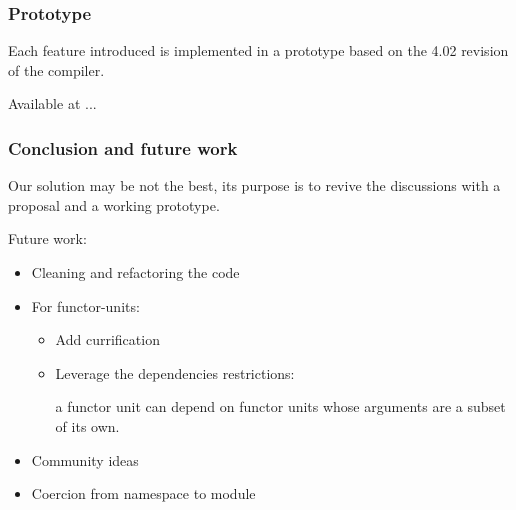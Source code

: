 \documentclass{beamer}
\begin{document}
\begin{frame}
\frametitle{Prototype}

Each feature introduced is implemented in a prototype based on the 4.02
revision of the compiler.

Available at ... 
\end{frame}

\begin{frame}
\frametitle{Conclusion and future work}

Our solution may be not the best, its purpose is to revive the discussions with
a proposal and a working prototype. 

\medskip

Future work:
\begin{itemize}
  \item Cleaning and refactoring the code
  \item For functor-units:
    \begin{itemize}
      \item Add currification
      \item Leverage the dependencies restrictions:

        a functor unit can depend on functor units whose arguments are a subset
        of its own.
    \end{itemize}
  \item Community ideas
  \item Coercion from namespace to module
\end{itemize}
\end{frame}
\end{document}
